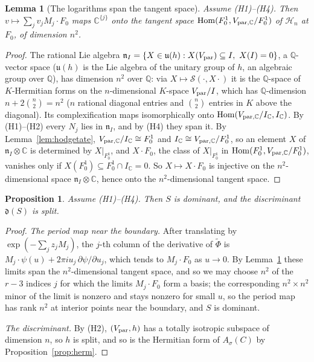 \documentclass[11pt]{amsart}
\newtheorem{proposition}[theorem]{Proposition}
\newtheorem{lemma}[theorem]{Lemma}
\theoremstyle{definition}
\theoremstyle{remark}
\newcommand{\Q}{\mathbb Q}
\newcommand{\C}{\mathbb C}
\newcommand{\Hom}{\operatorname{Hom}}
\newcommand{\cHn}{\mathcal H_n}
\newcommand{\Vp}{V_{\rm par}}
\newcommand{\VpC}{V_{{\rm par},\C}}
\newcommand{\fd}{\mathfrak d}
\begin{document}
\begin{lemma}[The logarithms span the tangent space]\label{lem:tangentspan}
Assume (H1)--(H4). Then $v\mapsto\sum_jv_jM_j\cdot F_0$ maps $\C^{\{j\}}$ onto the tangent space $\Hom(F^1_0,\VpC/F^1_0)$ of $\cHn$ at $F_0$, of dimension $n^2$.
\end{lemma}

\begin{proof}
The rational Lie algebra $\mathfrak n_I=\{X\in\mathfrak u(h):X(\Vp)\subseteq I,\ X(I)=0\}$, a $\Q$-vector space ($\mathfrak u(h)$ is the Lie algebra of the unitary group of $h$, an algebraic group over $\Q$), has dimension $n^2$ over $\Q$: via $X\mapsto\mathcal S(\cdot,X\cdot)$ it is the $\Q$-space of $K$-Hermitian forms on the $n$-dimensional $K$-space $\Vp/I$, which has $\Q$-dimension $n+2\binom n2=n^2$ ($n$ rational diagonal entries and $\binom n2$ entries in $K$ above the diagonal). Its complexification maps isomorphically onto $\Hom(\VpC/I_\C,I_\C)$. By (H1)--(H2) every $N_j$ lies in $\mathfrak n_I$, and by (H4) they span it. By Lemma~\ref{lem:hodgetate}, $\VpC/I_\C\cong F^1_0$ and $I_\C\cong \VpC/F^1_0$, so an element $X$ of $\mathfrak n_I\otimes\C$ is determined by $X|_{F^1_0}$, and $X\cdot F_0$, the class of $X|_{F^1_0}$ in $\Hom(F^1_0,\VpC/F^1_0)$, vanishes only if $X(F^1_0)\subseteq F^1_0\cap I_\C=0$. So $X\mapsto X\cdot F_0$ is injective on the $n^2$-dimensional space $\mathfrak n_I\otimes\C$, hence onto the $n^2$-dimensional tangent space.
\end{proof}

\begin{proposition}\label{prop:boundary}
Assume (H1)--(H4). Then $S$ is dominant, and the discriminant $\fd(S)$ is split.
\end{proposition}

\begin{proof}
\emph{The period map near the boundary.} After translating by $\exp(-\sum_jz_jM_j)$, the $j$-th column of the derivative of $\tilde\Phi$ is $M_j\cdot\psi(u)+2\pi iu_j\,\partial\psi/\partial u_j$, which tends to $M_j\cdot F_0$ as $u\to0$. By Lemma~\ref{lem:tangentspan} these limits span the $n^2$-dimensional tangent space, and so we may choose $n^2$ of the $r-3$ indices $j$ for which the limits $M_j\cdot F_0$ form a basis; the corresponding $n^2\times n^2$ minor of the limit is nonzero and stays nonzero for small $u$, so the period map has rank $n^2$ at interior points near the boundary, and $S$ is dominant.

\emph{The discriminant.} By (H2), $(\Vp,h)$ has a totally isotropic subspace of dimension $n$, so $h$ is split, and so is the Hermitian form of $A_\sigma(C)$ by Proposition~\ref{prop:herm}.
\end{proof}
\end{document}

